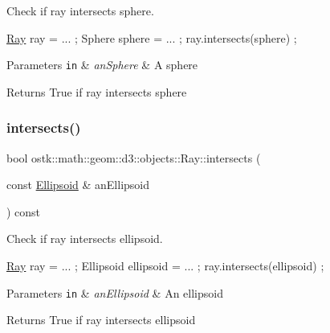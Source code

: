 Check if ray intersects sphere. 


\begin{DoxyCode}
\hyperlink{classostk_1_1math_1_1geom_1_1d3_1_1objects_1_1_ray_a78335698f8a4f72e613e607b13121df0}{Ray} ray = ... ;
Sphere sphere = ... ;
ray.intersects(sphere) ;
\end{DoxyCode}



\begin{DoxyParams}[1]{Parameters}
\mbox{\tt in}  & {\em an\+Sphere} & A sphere \\
\hline
\end{DoxyParams}
\begin{DoxyReturn}{Returns}
True if ray intersects sphere 
\end{DoxyReturn}
\mbox{\label{classostk_1_1math_1_1geom_1_1d3_1_1objects_1_1_ray_a48652010593cea440e028d9c02195108}} 
\subsubsection{\texorpdfstring{intersects()}{intersects()}\hspace{0.1cm}{\footnotesize\ttfamily [4/4]}}
{\footnotesize\ttfamily bool ostk\+::math\+::geom\+::d3\+::objects\+::\+Ray\+::intersects (\begin{DoxyParamCaption}\item[{const \hyperlink{classostk_1_1math_1_1geom_1_1d3_1_1objects_1_1_ellipsoid}{Ellipsoid} \&}]{an\+Ellipsoid }\end{DoxyParamCaption}) const}



Check if ray intersects ellipsoid. 


\begin{DoxyCode}
\hyperlink{classostk_1_1math_1_1geom_1_1d3_1_1objects_1_1_ray_a78335698f8a4f72e613e607b13121df0}{Ray} ray = ... ;
Ellipsoid ellipsoid = ... ;
ray.intersects(ellipsoid) ;
\end{DoxyCode}



\begin{DoxyParams}[1]{Parameters}
\mbox{\tt in}  & {\em an\+Ellipsoid} & An ellipsoid \\
\hline
\end{DoxyParams}
\begin{DoxyReturn}{Returns}
True if ray intersects ellipsoid 
\end{DoxyReturn}
\mbox{\label{classostk_1_1math_1_1geom_1_1d3_1_1objects_1_1_ray_ac0d991765b5d91a978fda87696b8069d}} 
